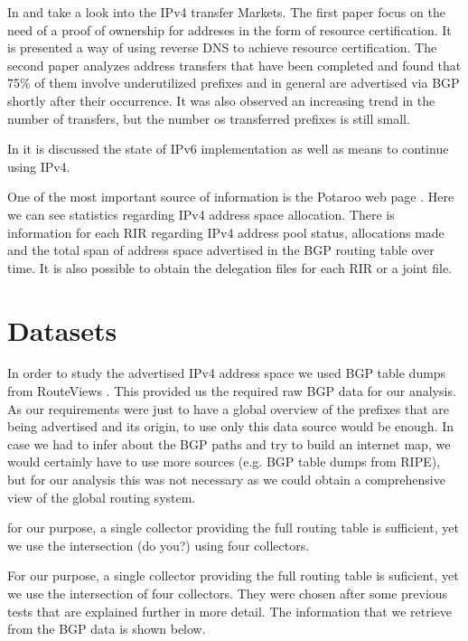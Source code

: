 \documentclass[11pt,a4paper]{scrreprt}
\begin{document}
In \cite{Land_Grab} and  \cite{IPv4_Transfer_Markets} take a look into the IPv4 transfer Markets. The first paper focus on the need of a proof of ownership for addreses in the form of resource certification. It is presented a way of using reverse DNS to achieve resource certification. The second paper analyzes address transfers that have been completed and found that 75\% of them involve underutilized prefixes and in general are advertised via BGP shortly after their occurrence. It was also observed an increasing trend in the number of transfers, but the number os transferred prefixes is still small.

In \cite{IPv6_state} it is discussed the state of IPv6 implementation as well as means to continue using IPv4.

One of the most important source of information is the Potaroo web page \cite{Potaroo}. 
Here we can see statistics regarding IPv4 address space allocation. There is information for each RIR regarding IPv4 address pool status, allocations made and the total span of address space advertised in the BGP routing table over time. It is also possible to obtain the delegation files for each RIR or a joint file.


\chapter{Datasets}

In order to study the advertised IPv4 address space we used BGP table dumps from RouteViews \cite{RouteViews}. This provided us the required raw BGP data for our analysis. As our requirements were just to have a global overview of the prefixes that are being advertised and its origin, to use only this data source would be enough. In case we had to infer about the BGP paths and try to build an internet map, we would certainly have to use more sources (e.g. BGP table dumps from RIPE), but for our analysis this was not necessary as we could obtain a comprehensive view of the global routing system.

for our purpose, a single collector providing the full
routing table is sufficient, yet we use the intersection (do you?) using
four collectors.

For our purpose, a single collector providing the full routing table is suficient, yet we use the intersection of four collectors. They were chosen after some previous tests that are explained further in more detail.
The information that we retrieve from the BGP data is shown below. 
\vspace{5mm}
\end{document}
